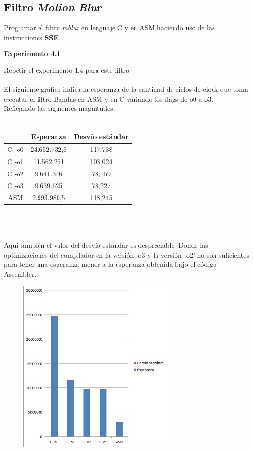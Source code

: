 \newpage
\subsection{Filtro \textit{Motion Blur}}
Programar el filtro \textit{mblur} en lenguaje C y en ASM haciendo uso de 
las instrucciones \textbf{SSE}.

\vspace*{0.3cm} \noindent
\textbf{Experimento 4.1}

Repetir el experimento 1.4 para este filtro \\
\\
El siguiente gr\'afico indica la esperanza de la cantidad de ciclos de clock que toma ejecutar el filtro Bandas en ASM y en C variando los flags de o0 a o3. \\
Reflejando las siguientes magnitudes: \\
\\
 \begin{tabular}[c]{|c|c|c|}
	\hline
		 & Esperanza & Desv\'io est\'andar\\
		\hline
C -o0 & 24.652.732,5 & 117,738 \\
\hline
C -o1 & 11.562.261 & 103,024  \\
\hline
C -o2 & 9.641.346 & 78,159  \\
\hline
C -o3 & 9.639.625 & 78,227 \\
\hline
ASM & 2.993.980,5 & 118,245 \\
\hline
	\end{tabular}\\\\
\\
Aqu\'i tambi\'en el valor del desv\'io est\'andar es despreciable. Donde las optimizaciones del compilador en la versi\'on -o3 y la versi\'on -o2' no son suficientes para tener una esperanza menor a la esperanza obtenida bajo el c\'odigo Assembler.\\
\newpage
\begin{figure}
  \begin{center}
	\includegraphics[width=0.7\textwidth]{imagenes/41.jpg}
  \end{center}
\end{figure}
\newpage